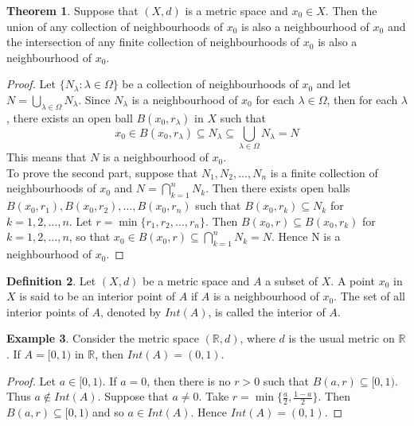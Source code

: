 \documentclass[11pt,a4paper]{article}
\theoremstyle{definition}
\newtheorem{thm}{Theorem}[subsection]
\newtheorem{defn}[thm]{Definition}
\newtheorem{exa}[thm]{Example}
\begin{document}
\begin{thm}
Suppose that $(X,d)$ is a metric space and $x_0\in X$. Then the union of any collection of neighbourhoods of $x_0$ is also a neighbourhood of $x_0$ and the intersection of any finite collection of neighbourhoods of $x_0$ is also a neighbourhood of $x_0$.
\end{thm}


\begin{proof}
Let $\{N_{\lambda}:\lambda \in \Omega \}$ be a collection of neighbourhoods of $x_0$ and let $N=\bigcup_{\lambda \in \Omega} N_{\lambda}$. Since $N_{\lambda}$ is a neighbourhood of $x_0$ for each $\lambda \in \Omega$, then for each $\lambda$, there exists an open ball $B(x_0,r_{\lambda})$ in $X$ such that $$x_0\in B(x_0,r_{\lambda})\subseteq N_{\lambda}\subseteq \bigcup_{\lambda \in \Omega} N_{\lambda}=N$$ This means that $N$ is a neighbourhood of $x_0$.\\
To prove the second part, suppose that $N_1,N_2,\ldots,N_n$ is a finite collection of neighbourhoods of $x_0$ and $N=\bigcap^{n}_{k=1} N_k$. Then there exists open balls $B(x_0,r_1), B(x_0,r_2),\ldots,B(x_0,r_n)$ such that $B(x_0,r_k)\subseteq N_k$ for $k=1,2,\ldots,n$. Let $r=\min\{r_1, r_2,\ldots,r_n\}$. Then $B(x_0,r)\subseteq B(x_0,r_k)$ for $k=1,2,\ldots,n$, so that $x_0\in B(x_0,r)\subseteq \bigcap^n_{k=1} N_k =N$. Hence N is a neighbourhood of $x_0$.
\end{proof}





\begin{defn}
Let $(X,d)$ be a metric space and $A$ a subset of $X$. A point $x_0$ in $X$ is said to be an interior point of $A$ if $A$ is a neighbourhood of $x_0$. The set of all interior points of $A$, denoted by $Int(A)$, is called the interior of $A$.
\end{defn}

\begin{exa}
Consider the metric space $(\mathbb{R},d)$, where $d$ is the usual metric on $\mathbb{R}$. If $A=[0,1)$ in $\mathbb{R}$, then $Int(A)=(0,1)$.
\end{exa}



\begin{proof}
Let $a\in [0,1)$. If $a=0$, then there is no $r>0$ such that $B(a,r)\subseteq [0,1)$. Thus $a\not\in Int(A)$. Suppose that $a\neq 0$. Take $r=\min\{\frac{a}{2},\frac{1-a}{2}\}$. Then $B(a,r)\subseteq [0,1)$ and so $a\in Int(A)$. Hence $Int(A)=(0,1)$.
\end{proof}
\end{document}
